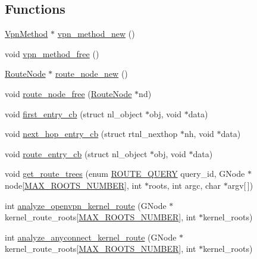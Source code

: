 \subsection*{Functions}
\begin{DoxyCompactItemize}
\item 
\hyperlink{route-tree_8h_a1034dd038389279bf422489d4d99d43a}{Vpn\+Method} $\ast$ \hyperlink{route-tree_8c_a3ccbf1b413fe282c1490701f739273a8}{vpn\+\_\+method\+\_\+new} ()
\item 
void \hyperlink{route-tree_8c_a06257b65d43c86e35b44ae0d91b226cf}{vpn\+\_\+method\+\_\+free} ()
\item 
\hyperlink{route-tree_8h_a1296be44c6672a1adb94ba6dc416682c}{Route\+Node} $\ast$ \hyperlink{route-tree_8c_a941ed51572db1d1d4720f8a329dd0d8b}{route\+\_\+node\+\_\+new} ()
\item 
void \hyperlink{route-tree_8c_a1b80d492072ee18f906bdd2fbaad9b4b}{route\+\_\+node\+\_\+free} (\hyperlink{route-tree_8h_a1296be44c6672a1adb94ba6dc416682c}{Route\+Node} $\ast$nd)
\item 
void \hyperlink{route-tree_8c_ac750dd5c6890dd949d1029d4363fa0e0}{first\+\_\+entry\+\_\+cb} (struct nl\+\_\+object $\ast$obj, void $\ast$data)
\item 
void \hyperlink{route-tree_8c_a8402c2baca9819b3791b35b6c1645ce6}{next\+\_\+hop\+\_\+entry\+\_\+cb} (struct rtnl\+\_\+nexthop $\ast$nh, void $\ast$data)
\item 
void \hyperlink{route-tree_8c_a112b373b8e4a4a0eacfba3cc078e5ce2}{route\+\_\+entry\+\_\+cb} (struct nl\+\_\+object $\ast$obj, void $\ast$data)
\item 
void \hyperlink{route-tree_8c_a7e256826bca6c828a8564f27f84dd517}{get\+\_\+route\+\_\+trees} (enum \hyperlink{route-tree_8c_aed8cdbb52dbe32c343a8c26887888e7f}{R\+O\+U\+T\+E\+\_\+\+Q\+U\+E\+RY} query\+\_\+id, G\+Node $\ast$node\mbox{[}\hyperlink{route-tree_8h_a8e1da3af3417de420798c8b448b6a8cb}{M\+A\+X\+\_\+\+R\+O\+O\+T\+S\+\_\+\+N\+U\+M\+B\+ER}\mbox{]}, int $\ast$roots, int argc, char $\ast$argv\mbox{[}$\,$\mbox{]})
\item 
int \hyperlink{route-tree_8c_a023982baea4d991af1755c75365e6070}{analyze\+\_\+openvpn\+\_\+kernel\+\_\+route} (G\+Node $\ast$kernel\+\_\+route\+\_\+roots\mbox{[}\hyperlink{route-tree_8h_a8e1da3af3417de420798c8b448b6a8cb}{M\+A\+X\+\_\+\+R\+O\+O\+T\+S\+\_\+\+N\+U\+M\+B\+ER}\mbox{]}, int $\ast$kernel\+\_\+roots)
\item 
int \hyperlink{route-tree_8c_ad4fe4de0af6177aad9c1936fcaa1d988}{analyze\+\_\+anyconnect\+\_\+kernel\+\_\+route} (G\+Node $\ast$kernel\+\_\+route\+\_\+roots\mbox{[}\hyperlink{route-tree_8h_a8e1da3af3417de420798c8b448b6a8cb}{M\+A\+X\+\_\+\+R\+O\+O\+T\+S\+\_\+\+N\+U\+M\+B\+ER}\mbox{]}, int $\ast$kernel\+\_\+roots)

\end{DoxyCompactItemize}
